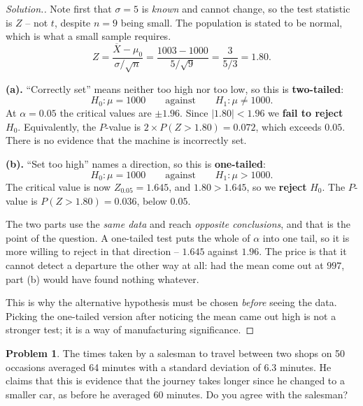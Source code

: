 \documentclass[11pt,a4paper]{article}
\theoremstyle{definition}
\newtheorem{problemx}{Problem}[section]
\newenvironment{problem}{\begin{problemx}}{\end{problemx}}
\newenvironment{solution}
  {\renewcommand{\qedsymbol}{}\begin{proof}[\textit{Solution}.]}
  {\end{proof}}
\begin{document}
\begin{solution}
Note first that $\sigma = 5$ is \emph{known} and cannot change, so the test statistic is
$Z$ -- not $t$, despite $n = 9$ being small. The population is stated to be normal, which
is what a small sample requires.
\[Z=\frac{\overline{X}-\mu_0}{\sigma/\sqrt{n}}
 =\frac{1003-1000}{5/\sqrt{9}}=\frac{3}{5/3}=1.80.\]

\textbf{(a).} ``Correctly set'' means neither too high nor too low, so this is
\textbf{two-tailed}:
\[H_0:\mu=1000 \qquad\text{against}\qquad H_1:\mu\neq 1000.\]
At $\alpha=0.05$ the critical values are $\pm 1.96$. Since $|1.80|<1.96$ we
\textbf{fail to reject} $H_0$. Equivalently, the $P$-value is
$2\times P(Z>1.80)=0.072$, which exceeds $0.05$. There is no evidence that the machine is
incorrectly set.

\textbf{(b).} ``Set too high'' names a direction, so this is \textbf{one-tailed}:
\[H_0:\mu=1000 \qquad\text{against}\qquad H_1:\mu>1000.\]
The critical value is now $Z_{0.05}=1.645$, and $1.80>1.645$, so we \textbf{reject} $H_0$.
The $P$-value is $P(Z>1.80)=0.036$, below $0.05$.

\medskip
The two parts use the \emph{same data} and reach \emph{opposite conclusions}, and that is
the point of the question. A one-tailed test puts the whole of $\alpha$ into one tail, so
it is more willing to reject in that direction -- $1.645$ against $1.96$. The price is that
it cannot detect a departure the other way at all: had the mean come out at $997$, part (b)
would have found nothing whatever.

This is why the alternative hypothesis must be chosen \emph{before} seeing the data. Picking
the one-tailed version after noticing the mean came out high is not a stronger test; it is
a way of manufacturing significance.
\end{solution}

\begin{problem}
The times taken by a salesman to travel between two shops on 50 occasions averaged 64
minutes with a standard deviation of $6.3$ minutes. He claims that this is evidence that the
journey takes longer since he changed to a smaller car, as before he averaged 60 minutes.
Do you agree with the salesman?
\end{problem}
\end{document}

